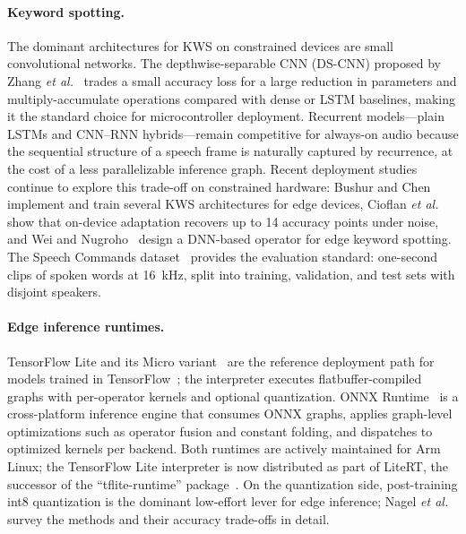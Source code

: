 \documentclass[conference,a4paper]{IEEEtran}
\begin{document}
\paragraph{Keyword spotting.}
The dominant architectures for KWS on constrained devices are small convolutional networks. The depthwise-separable CNN (DS-CNN) proposed by Zhang \emph{et al.}~\cite{zhang2017helloedge} trades a small accuracy loss for a large reduction in parameters and multiply-accumulate operations compared with dense or LSTM baselines, making it the standard choice for microcontroller deployment. Recurrent models---plain LSTMs and CNN--RNN hybrids---remain competitive for always-on audio because the sequential structure of a speech frame is naturally captured by recurrence, at the cost of a less parallelizable inference graph. Recent deployment studies continue to explore this trade-off on constrained hardware: Bushur and Chen~\cite{bushur2023kws} implement and train several KWS architectures for edge devices, Cioflan \emph{et al.}~\cite{cioflan2024kwsdomain} show that on-device adaptation recovers up to 14 accuracy points under noise, and Wei and Nugroho~\cite{wei2025kwsdnn} design a DNN-based operator for edge keyword spotting. The Speech Commands dataset~\cite{warden2018speechcommands} provides the evaluation standard: one-second clips of spoken words at 16~kHz, split into training, validation, and test sets with disjoint speakers.

\paragraph{Edge inference runtimes.}
TensorFlow Lite and its Micro variant~\cite{david2021tfmicro} are the reference deployment path for models trained in TensorFlow~\cite{abadi2016tensorflow}; the interpreter executes flatbuffer-compiled graphs with per-operator kernels and optional quantization. ONNX Runtime~\cite{onnxruntime} is a cross-platform inference engine that consumes ONNX graphs, applies graph-level optimizations such as operator fusion and constant folding, and dispatches to optimized kernels per backend. Both runtimes are actively maintained for Arm Linux; the TensorFlow Lite interpreter is now distributed as part of LiteRT, the successor of the ``tflite-runtime'' package~\cite{ai-edgelitert}. On the quantization side, post-training int8 quantization is the dominant low-effort lever for edge inference; Nagel \emph{et al.}~\cite{nagel2021quantization} survey the methods and their accuracy trade-offs in detail.
\end{document}
